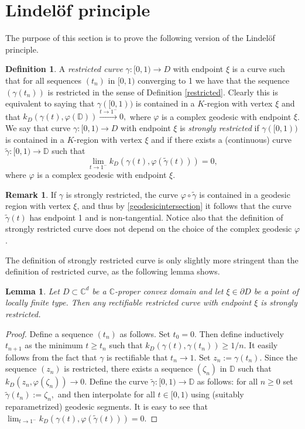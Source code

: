 \documentclass[11pt, reqno]{amsart}
\numberwithin{equation}{section}
\newtheorem{lemma}[theorem]{Lemma}
\theoremstyle{definition}
\newtheorem{remark}[theorem]{Remark}
\newtheorem{definition}[theorem]{Definition}
\newcommand{\C}{\mathbb{C}}
\newcommand{\D}{\mathbb{D}}
\begin{document}
{{{		\section{Lindel\"of principle}
		
		The purpose of this section is to prove the following version of the Lindel\"of principle. 	
		
		\begin{definition}
			A {\sl restricted curve} $\gamma:[0,1)\to D$ with endpoint $\xi$ is a curve such that for all sequences $(t_n)$ in $[0,1)$ converging to 1 we have that the  sequence $(\gamma(t_n))$ is restricted in the sense of Definition \ref{restricted}.
			Clearly this is equivalent to saying that $\gamma([0,1))$ is contained in a $K$-region with vertex $\xi$ and that $k_D(\gamma(t),\varphi(\D))\stackrel{t\to 1^-}\longrightarrow 0,$ where $\varphi$ is a complex geodesic with endpoint $\xi$.
			We say that  curve  $\gamma:[0,1)\to D$ with endpoint $\xi$ is {\sl strongly restricted} if $\gamma([0,1))$  is contained in a $K$-region with vertex $\xi$ and if there exists a (continuous) curve $\tilde \gamma\colon [0,1)\to \D$ such that
			\begin{equation}\label{stronglyrestricted}\lim_{t\to1^-}k_D(\gamma(t),\varphi(\tilde \gamma(t)))=0,
			\end{equation}
			where $\varphi$ is a complex geodesic with endpoint $\xi$.
		\end{definition}
		
		\begin{remark}
			If $\gamma$ is strongly restricted, the curve $\varphi\circ \tilde \gamma$ is contained in a geodesic region with vertex $\xi$, and thus by \eqref{geodesicintersection} it follows that the curve $\tilde \gamma(t)$ has endpoint 1 and is  non-tangential.  Notice also that the definition of strongly restricted curve does not depend on  the choice of the complex geodesic $\varphi$.
		\end{remark}
		The definition of strongly restricted curve is only slightly more stringent than the definition of restricted curve, as the following lemma shows.
		\begin{lemma}\label{exadmissible}
			Let $D\subset\C^d$ be a $\C$-proper convex domain and let $\xi\in\partial D$ be a point of locally finite type.
			Then any  rectifiable restricted  curve with endpoint $\xi$ is strongly restricted.
		\end{lemma}
		\begin{proof}
			Define a sequence $(t_n)$ as follows. Set $t_0=0$. Then define inductively $t_{n+1}$ as the minimum $t\geq t_{n}$ such that $k_D(\gamma(t),\gamma(t_n))\geq 1/n.$
			It easily follows from the fact that $\gamma$ is rectifiable that $t_n\to 1$.
			Set $z_n:=\gamma(t_n)$. Since the sequence $(z_n)$ is restricted, there exists a sequence $(\zeta_n)$ in $\D$ such that $k_D(z_n,\varphi(\zeta_n))\to 0$. Define the curve $\tilde \gamma\colon[0,1)\to \D$ as follows: for all $n\geq 0$ set
			$\tilde \gamma(t_n):=\zeta_n,$ and then interpolate for all $t\in  [0,1)$ using (suitably reparametrized) geodesic segments.
			It is easy to see that $\lim_{t\to1^-}k_D(\gamma(t),\varphi(\tilde \gamma(t)))=0.$
		\end{proof}
		
}}}
\end{document}
